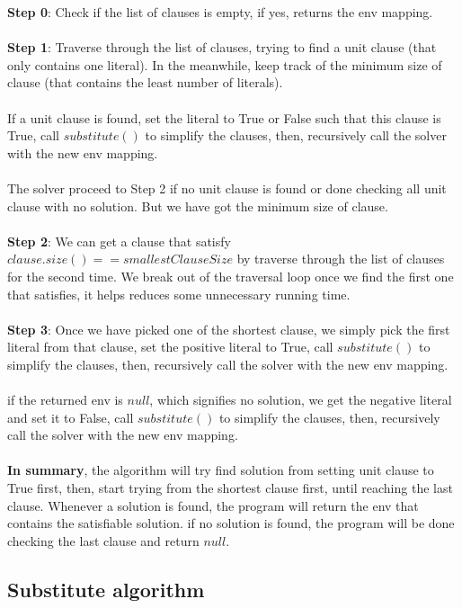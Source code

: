 \documentclass[a4paper,12pt]{article}
\begin{document}
\begin{multicols}{2}
\textbf{Step 0}: Check if the list of clauses is empty, if yes, returns the env mapping.\\
\\
\textbf{Step 1}: Traverse through the list of clauses,
trying to find a unit clause (that only contains one literal). 
In the meanwhile, keep track of the minimum size of clause 
(that contains the least number of literals). \\
\\
If a unit clause is found, set the literal to True or False such that this clause is True, 
call $substitute()$ to simplify the clauses, then, recursively call the solver with the new env mapping.\\
\\ 
The solver proceed to Step 2 if no unit clause is found or 
done checking all unit clause with no solution. 
But we have got the minimum size of clause. \\
\\
\textbf{Step 2}: We can get a clause that satisfy $clause.size() == smallestClauseSize$
by traverse through the list of clauses for the second time. 
We break out of the traversal loop once we find the first one that satisfies, 
it helps reduces some unnecessary running time.\\
\\
\textbf{Step 3}: Once we have picked one of the shortest clause, 
we simply pick the first literal from that clause, set the positive literal to True,
call $substitute()$ to simplify the clauses, then, 
recursively call the solver with the new env mapping.\\
\\
if the returned env is $null$, which signifies no solution, we get the negative literal
and set it to False, call $substitute()$ to simplify the clauses, then, 
recursively call the solver with the new env mapping.\\
\\
\textbf{In summary}, the algorithm will try find solution from setting unit clause to True first,
then, start trying from the shortest clause first, until reaching the last clause.
Whenever a solution is found, the program will return the env that contains the satisfiable solution.
if no solution is found, the program will be done checking the last clause and return $null$.

\subsection*{Substitute algorithm}


\end{multicols}
\end{document}
